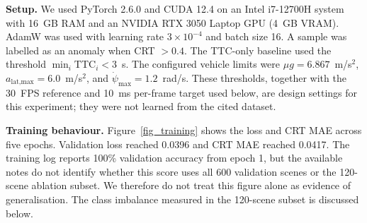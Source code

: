 \textbf{Setup.} We used PyTorch 2.6.0 and CUDA 12.4 on an Intel i7-12700H system with 16~GB RAM and an NVIDIA RTX 3050 Laptop GPU (4~GB VRAM). AdamW was used with learning rate $3 \times 10^{-4}$ and batch size 16. A sample was labelled as an anomaly when CRT $> 0.4$. The TTC-only baseline used the threshold $\min_i \text{TTC}_i < 3$~s. The configured vehicle limits were $\mu g=6.867$~m/s$^2$, $a_{\text{lat,max}}=6.0$~m/s$^2$, and $\dot{\psi}_{\max}=1.2$~rad/s. These thresholds, together with the 30~FPS reference and 10~ms per-frame target used below, are design settings for this experiment; they were not learned from the cited dataset.

\textbf{Training behaviour.} Figure~\ref{fig_training} shows the loss and CRT MAE across five epochs. Validation loss reached 0.0396 and CRT MAE reached 0.0417. The training log reports 100\% validation accuracy from epoch 1, but the available notes do not identify whether this score uses all 600 validation scenes or the 120-scene ablation subset. We therefore do not treat this figure alone as evidence of generalisation. The class imbalance measured in the 120-scene subset is discussed below.


